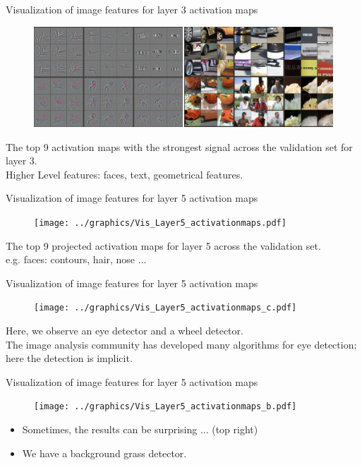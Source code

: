 \documentclass[xcolor=pdftex,dvipsnames,table]{beamer}
\begin{document}
\begin{frame}{Visualization of image features for layer 3 activation maps}
\begin{figure}[htb]
  \centering
  \includegraphics[width=\textwidth]{../graphics/Vis_Layer3_activationmaps.png}
\end{figure}
The top 9 activation maps with the strongest signal across the validation set for layer 3. \\
Higher Level features: faces, text, geometrical features.
\end{frame}

\begin{frame}{Visualization of image features for layer 5 activation maps}
\begin{figure}[htb]
  \centering
  \texttt{[image: ../graphics/Vis\_Layer5\_activationmaps.pdf]}
\end{figure}
The top 9 projected activation maps for layer 5 across the validation set. \\
e.g. faces: contours, hair, nose ... 
\end{frame}

\begin{frame}{Visualization of image features for layer 5 activation maps}
\begin{figure}[htb]
  \centering
  \texttt{[image: ../graphics/Vis\_Layer5\_activationmaps\_c.pdf]}
\end{figure}
Here, we observe an eye detector and a wheel detector. \\
The image analysis community has developed many algorithms for eye detection; here the detection is implicit.
\end{frame}

\begin{frame}{Visualization of image features for layer 5 activation maps}
\begin{figure}[htb]
  \centering
  \texttt{[image: ../graphics/Vis\_Layer5\_activationmaps\_b.pdf]}
\end{figure}
\begin{itemize}
\item <1-> Sometimes, the results can be surprising ... (top right)
\item <2-> We have a background grass detector. 
\end{itemize}
\end{frame}
\end{document}
